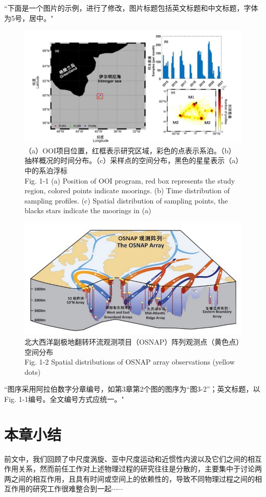 {\color{red}``下面是一个图片的示例，进行了修改，图片标题包括英文标题和中文标题，字体为5号，居中。"}

\begin{figure}[htbp]
    \centering
    \includegraphics[width=0.8\linewidth]{img/fig_1_1_study_area.jpg}
    \caption{\centering （a）OOI项目位置，红框表示研究区域，彩色的点表示系泊。（b）抽样概况的时间分布。（c）采样点的空间分布，黑色的星星表示（a）中的系泊浮标\\ Fig. 1-1 (a) Position of OOI program, red box represents the study region, colored points indicate moorings. (b) Time distribution of sampling profiles. (c) Spatial distribution of sampling points, the blacks stars indicate the moorings in (a)}
    \label{fig:enter-label}
\end{figure}

\begin{figure}[htbp]
    \centering
    \includegraphics[width=0.5\linewidth]{img/fig_1_2_OSNAP.jpg}
    \caption{\centering 北大西洋副极地翻转环流观测项目（OSNAP）阵列观测点（黄色点）空间分布 \\
    Fig. 1-2  Spatial distributions of OSNAP array observations (yellow dots)}
    \label{fig:enter-label}
\end{figure}

{\color{red}``图序采用阿拉伯数字分章编号，如第3章第2个图的图序为“图3-2”；英文标题，以Fig. 1-1编号。全文编号方式应统一。"}

\section{本章小结}

前文中，我们回顾了中尺度涡旋、亚中尺度运动和近惯性内波以及它们之间的相互作用关系，然而前任工作对上述物理过程的研究往往是分散的，主要集中于讨论两两之间的相互作用，且具有时间或空间上的依赖性的，导致不同物理过程之间的相互作用的研究工作很难整合到一起$\cdots\cdots$